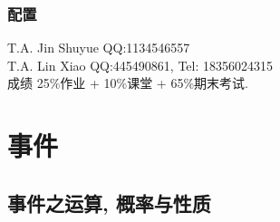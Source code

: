 \documentclass[../Statistics.tex]{subfiles}
\begin{document}
\subsubsection*{配置} %
\label{ssub:配置}

\noindent
T.A. Jin Shuyue QQ:1134546557\\
T.A. Lin Xiao QQ:445490861, Tel: 18356024315\\

成绩 25\%作业 + 10\%课堂 + 65\%期末考试.


\section{事件} %
\label{sec:事件}

\subsection{事件之运算, 概率与性质} %
\label{sub:事件之运算_概率与性质}
\end{document}
